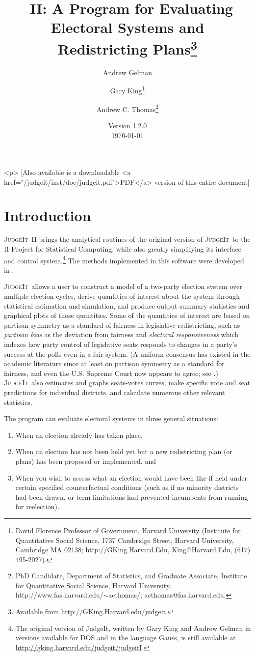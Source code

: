 \documentclass[oneside,letterpaper,titlepage]{article}
\title{\JudgeIt~II: A Program for Evaluating Electoral Systems and
  Redistricting Plans\thanks{Available from
    http://GKing.Harvard.edu/judgeit.}}
\author{Andrew Gelman \and Gary King\thanks{David Florence Professor
    of Government, Harvard University (Institute for Quantitative
    Social Science, 1737 Cambridge Street, Harvard University,
    Cambridge MA 02138; http://GKing.Harvard.Edu, King@Harvard.Edu,
    (617) 495-2027).}  \and %
  Andrew C. Thomas\thanks{PhD Candidate, Department of Statistics, and Graduate Associate, Institute for Quantitative Social Science, Harvard University. http://www.fas.harvard.edu/$\sim$acthomas/; acthomas@fas.harvard.edu.}}
\date{Version 1.2.0\\ \today}
\newcommand{\JudgeIt}{\textsc{JudgeIt}\ }
\begin{document}
\maketitle

\begin{rawhtml}
  <p> [Also available is a downloadable <a
  href="/judgeit/inst/doc/judgeit.pdf">PDF</a> version of this entire document]
\end{rawhtml}

\tableofcontents
\clearpage

\section{Introduction}

\JudgeIt II brings the analytical routines of the original version of
\JudgeIt to the R Project for Statistical Computing, while also greatly
simplifying its interface and control system.\footnote{The original
  version of JudgeIt, written by Gary King and Andrew Gelman in
  versions available for DOS and in the language Gauss, is still
  available at \url{http://gking.harvard.edu/judgeit/judgeitI}.}  The
methods implemented in this software were developed in
\citet{GelKin90,GelKin90b,GelKin94a,GelKin94b,KinGel91,GelKatKin04}.

\JudgeIt allows a user to construct a model of a two-party election
system over multiple election cycles, derive quantities of interest
about the system through statistical estimation and simulation, and
produce output summary statistics and graphical plots of those
quantities.  Some of the quantities of interest are based on partisan
symmetry as a standard of fairness in legislative redistricting, such
as \emph{partisan bias} as the deviation from fairness and
\emph{electoral responsiveness} which indexes how party control of
legislative seats responds to changes in a party's success at the
polls even in a fair system.  (A uniform consensus has existed in the
academic literature since at least \citet{KinBro87} on partisan
symmetry as a standard for fairness, and even the U.S.  Supreme Court
now appears to agree; see \citealt{GroKin07}.)  \JudgeIt also estimates
and graphs seats-votes curves, make specific vote and seat
predictions for individual districts, and calculate numerous other
relevant statistics.

The program can evaluate electoral systems in three general situations:
\begin{enumerate}
\item When an election already has taken place,
\item When an election has not been held yet but a new redistricting
  plan (or plans) has been proposed or implemented, and
\item When you wish to assess what an election would have been like if
  held under certain specified counterfactual conditions (such as if
  no minority districts had been drawn, or term limitations had
  prevented incumbents from running for reelection).
\end{enumerate}
\end{document}
